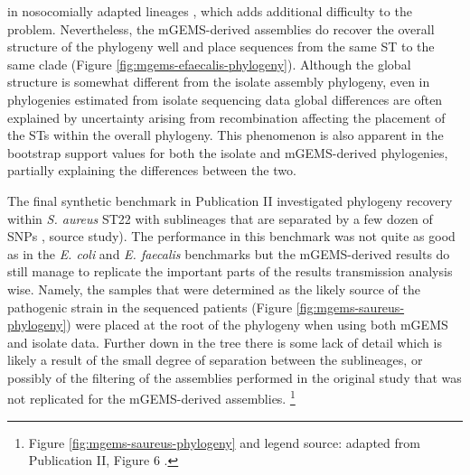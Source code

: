 \documentclass[officiallayout]{tktla}
\let\svthefootnote\thefootnote
\begin{document}
in nosocomially adapted lineages \citep{pontinen2021apparent}, which
adds additional difficulty to the problem. Nevertheless, the
mGEMS-derived assemblies do recover the overall structure of the
phylogeny well and place sequences from the same ST to the same clade
(Figure \ref{fig:mgems-efaecalis-phylogeny}). Although the global structure is somewhat
different from the isolate assembly phylogeny, even in phylogenies
estimated from isolate sequencing data global differences are often
explained by uncertainty arising from recombination affecting the
placement of the STs within the overall phylogeny. This phenomenon is
also apparent in the bootstrap support values for both the isolate and
mGEMS-derived phylogenies, partially explaining the differences
between the two.

The final synthetic benchmark in Publication II investigated
phylogeny recovery within \textit{S. aureus} ST22 with sublineages
that are separated by a few dozen of SNPs \citep{paterson2015capturing}, source
study). The performance in this benchmark was not quite as good as in
the \textit{E. coli} and \textit{E. faecalis} benchmarks but the
mGEMS-derived results do still manage to replicate the important parts
of the results transmission analysis wise. Namely, the samples that
were determined as the likely source of the pathogenic strain in the
sequenced patients (Figure \ref{fig:mgems-saureus-phylogeny}) were placed
at the root of the phylogeny when using both mGEMS and isolate
data. Further down in the tree there is some lack of detail which is
likely a result of the small degree of separation between the
sublineages, or possibly of the filtering of the assemblies performed
in the original study that was not replicated for the mGEMS-derived
assemblies.
\noindent\let\thefootnote\relax\footnote{Figure \ref{fig:mgems-saureus-phylogeny} and legend source: adapted from Publication II, Figure 6 \citep{maklin_bacterial_2021}.}
\addtocounter{footnote}{-1}\let\thefootnote\svthefootnote
\end{document}
